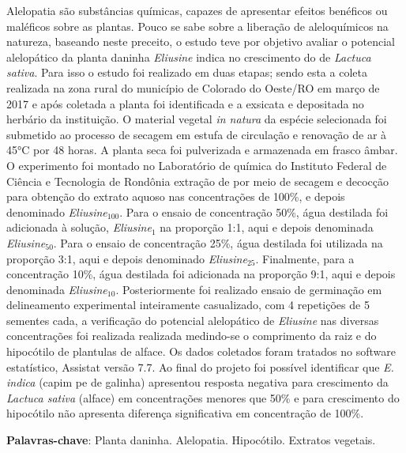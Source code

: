 \documentclass[article,12pt,onesidea,4paper,english,brazil]{abntex2}
\begin{document}
	\noindent Alelopatia são substâncias químicas, capazes de apresentar efeitos
	benéficos ou maléficos sobre as plantas. Pouco se sabe sobre a liberação de
	aleloquímicos na natureza, baseando neste preceito, o estudo teve por objetivo
	avaliar o potencial alelopático da planta daninha \textit{Eliusine} indica no crescimento do
	de \textit{Lactuca sativa}. Para isso o estudo foi realizado em duas etapas; sendo esta a
	coleta realizada na zona rural do município de Colorado do Oeste/RO em março de
	2017 e após coletada a planta foi identificada e a exsicata e depositada no herbário
	da instituição. O material vegetal \textit{in natura} da espécie selecionada foi submetido ao processo de secagem em estufa de circulação e renovação de ar à 45°C por 48 horas. A planta seca foi pulverizada e armazenada em frasco âmbar. O experimento
	foi montado no Laboratório de química do Instituto Federal de Ciência e Tecnologia
	de Rondônia extração de por meio de secagem e decocção para obtenção do
	extrato aquoso nas concentrações de 100\%, e depois denominado \textit{Eliusine}$_{100}$. Para
	o ensaio de concentração 50\%, água destilada foi adicionada à solução, \textit{Eliusine}$_1$ na
	proporção 1:1, aqui e depois denominada \textit{Eliusine}$_{50}$. Para o ensaio de concentração
	25\%, água destilada foi utilizada na proporção 3:1, aqui e depois denominado
	\textit{Eliusine}$_{25}$. Finalmente, para a concentração 10\%, água destilada foi adicionada na
	proporção 9:1, aqui e depois denominada \textit{Eliusine}$_{10}$. Posteriormente foi realizado
	ensaio de germinação em delineamento experimental inteiramente casualizado, com
	4 repetições de 5 sementes cada, a verificação do potencial alelopático de \textit{Eliusine}
	nas diversas concentrações foi realizada realizada medindo-se o comprimento da
	raiz e do hipocótilo de plantulas de alface. Os dados coletados foram tratados no
	software estatístico, Assistat versão 7.7. Ao final do projeto foi possível identificar
	que \textit{E. indica} (capim pe de galinha) apresentou resposta negativa para crescimento
	da \textit{Lactuca sativa} (alface) em concentrações menores que 50\% e para crescimento
	do hipocótilo não apresenta diferença significativa em concentração de 100\%.
	
	\vspace{\onelineskip}
	
	\noindent
	\textbf{Palavras-chave}: Planta daninha. Alelopatia. Hipocótilo. Extratos vegetais.	
	
\end{document}
